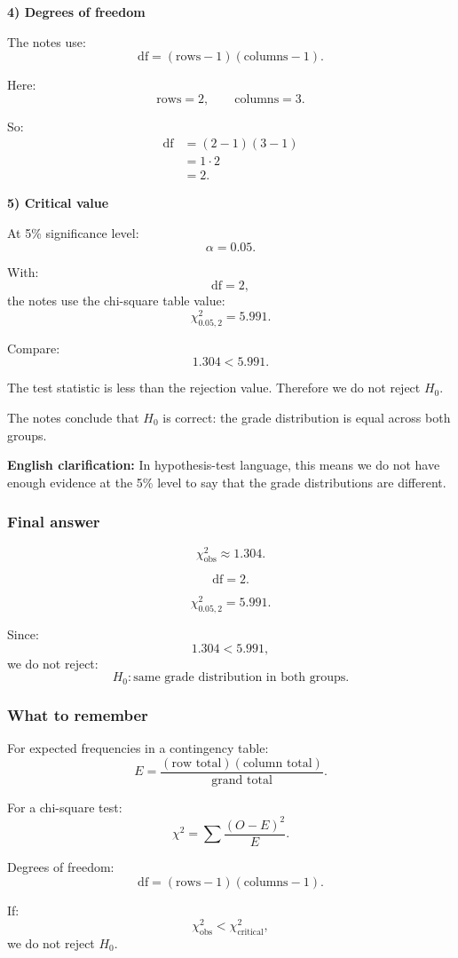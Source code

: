 \documentclass[10pt]{article}
\begin{document}
\textbf{4) Degrees of freedom}

The notes use:
\[
\text{df}
=
(\text{rows}-1)(\text{columns}-1).
\]

Here:
\[
\text{rows}=2,
\qquad
\text{columns}=3.
\]

So:
\begin{align*}
\text{df}
&=
(2-1)(3-1)
\\[2mm]
&=
1\cdot 2
\\[2mm]
&=2.
\end{align*}

\textbf{5) Critical value}

At 5\% significance level:
\[
\alpha=0.05.
\]

With:
\[
\text{df}=2,
\]
the notes use the chi-square table value:
\[
\chi^2_{0.05,2}=5.991.
\]

Compare:
\[
1.304<5.991.
\]

The test statistic is less than the rejection value.
Therefore we do not reject \(H_0\).

The notes conclude that \(H_0\) is correct:
the grade distribution is equal across both groups.

\textbf{English clarification:}
In hypothesis-test language, this means we do not
have enough evidence at the 5\% level to say that
the grade distributions are different.

\subsubsection*{Final answer}

\[
\chi^2_{\text{obs}}\approx 1.304.
\]

\[
\text{df}=2.
\]

\[
\chi^2_{0.05,2}=5.991.
\]

Since:
\[
1.304<5.991,
\]
we do not reject:
\[
H_0:
\text{same grade distribution in both groups.}
\]

\subsubsection*{What to remember}

For expected frequencies in a contingency table:
\[
E=
\frac{
(\text{row total})(\text{column total})
}{
\text{grand total}
}.
\]

For a chi-square test:
\[
\chi^2
=
\sum
\frac{(O-E)^2}{E}.
\]

Degrees of freedom:
\[
\text{df}
=
(\text{rows}-1)(\text{columns}-1).
\]

If:
\[
\chi^2_{\text{obs}}
<
\chi^2_{\text{critical}},
\]
we do not reject \(H_0\).
\end{document}
